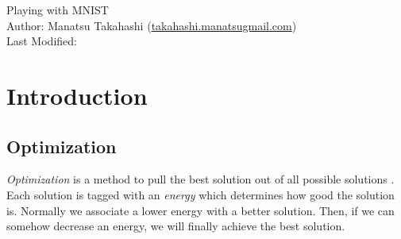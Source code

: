 \documentclass{article}
\theoremstyle{definition}
\begin{document}
\begin{center}
{\Large Playing with MNIST}\\
\enter
Author: Manatsu Takahashi (\href{mailto:takahashi.manatsu[AT][MARK]gmail.com}{takahashi.manatsugmail.com})\\
Last Modified: \DTMnow
\end{center}

\enter
\begin{abstract}
In this tutorial paper, we learn what is and how to use Neural Network, which is an algorithm in the field of machine learning. We supply both theoretical explanations and a program which learns MNIST dataset to recognize hand-written digits. As for the program, it is written in C++ (not in common Python) without external library and the code structure is explained in detail. We also provide a simple GUI application in which a user draws a digit using his/her mouse and the true digit the user intended is inferred. It should be easy to apply neural networks to other problems after reading this paper. All the source codes are available in \href{https://github.com/your-diary/Playing-with-MNIST}{https://github.com/your-diary/Playing-with-MNIST} under MIT license.

\end{abstract}

\enter
\tableofcontents


\newpage
\section{Introduction}


\subsection{Optimization}

{\it Optimization} is a method to pull the best solution out of all possible solutions \cite{1}. Each solution is tagged with an {\it energy} which determines how good the solution is. Normally we associate a lower energy with a better solution. Then, if we can somehow decrease an energy, we will finally achieve the best solution.\\
\end{document}
